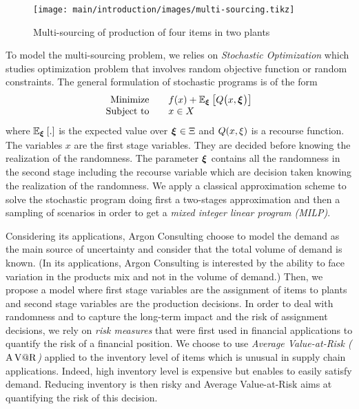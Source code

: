 \begin{figure}[!ht]
  \centering
  \texttt{[image: main/introduction/images/multi-sourcing.tikz]}
  \caption{Multi-sourcing of production of four items in two plants}
  \label{fig:intro:en:multi-sourcing}
\end{figure}


\medskip


To model the multi-sourcing problem, we relies on \emph{Stochastic Optimization} which studies optimization problem that involves random objective function or random constraints.
The general formulation of stochastic programs is of the form
\begin{equation}
\begin{array}{rl}
  \mbox{Minimize} \quad & f(x) + \espe_{\va\xi}\sqbracket{Q\bracket{x,\va\xi}} \\
  \mbox{Subject to} \quad & x \in X
\end{array}
\end{equation}
where $\espe_{\va\xi}\sqbracket{.}$ is the expected value over $\va\xi\in\Xi$ and $Q\bracket{x,\xi}$ is a recourse function. 
The variables $x$ are the first stage variables.
They are decided before knowing the realization of the randomness.
The parameter $\va\xi$ contains all the randomness in the second stage including the recourse variable which are decision taken knowing the realization of the randomness.
We apply a classical approximation scheme to solve the stochastic program doing first a two-stages approximation and then a sampling of scenarios in order to get a \emph{mixed integer linear program (MILP)}.


\medskip


Considering its applications, Argon Consulting choose to model the demand as the main source of uncertainty  and consider that the total volume of demand is known.
(In its applications, Argon Consulting is interested by the ability to face variation in the products mix and not in the volume of demand.)
Then, we propose a model where first stage variables are the assignment of items to plants and second stage variables are the production decisions.
In order to deal with randomness and to capture the long-term impact and the risk of assignment decisions, we rely on \emph{risk measures} that were first used in financial applications to quantify the risk of a financial position.
We choose to use \emph{Average Value-at-Risk ($\operatorname{A\operatorname{V@R}}$)} applied to the inventory level of items which is unusual in supply chain applications.
Indeed, high inventory level is expensive but enables to easily satisfy demand.
Reducing inventory is then risky and Average Value-at-Risk aims at quantifying the risk of this decision.



